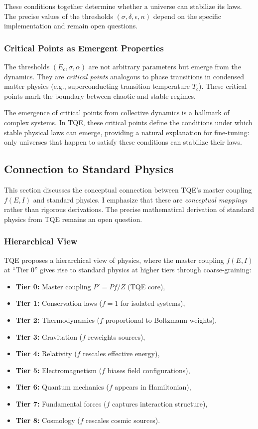 \documentclass[12pt,a4paper]{article}
\theoremstyle{definition}
\theoremstyle{remark}
\begin{document}
These conditions together determine whether a universe can stabilize its laws. The precise values of the thresholds $(\sigma, \delta, \epsilon, n)$ depend on the specific implementation and remain open questions.

\subsubsection{Critical Points as Emergent Properties}

The thresholds $(E_c, \sigma, \alpha)$ are not arbitrary parameters but emerge from the dynamics. They are \emph{critical points} analogous to phase transitions in condensed matter physics (e.g., superconducting transition temperature $T_c$). These critical points mark the boundary between chaotic and stable regimes.

The emergence of critical points from collective dynamics is a hallmark of complex systems. In TQE, these critical points define the conditions under which stable physical laws can emerge, providing a natural explanation for fine-tuning: only universes that happen to satisfy these conditions can stabilize their laws.

\subsection{Connection to Standard Physics}

This section discusses the conceptual connection between TQE's master coupling $f(E,I)$ and standard physics. I emphasize that these are \emph{conceptual mappings} rather than rigorous derivations. The precise mathematical derivation of standard physics from TQE remains an open question.

\subsubsection{Hierarchical View}

TQE proposes a hierarchical view of physics, where the master coupling $f(E,I)$ at ``Tier 0'' gives rise to standard physics at higher tiers through coarse-graining:

\begin{itemize}
\item \textbf{Tier 0:} Master coupling $P' = P f / Z$ (TQE core),
\item \textbf{Tier 1:} Conservation laws ($f = 1$ for isolated systems),
\item \textbf{Tier 2:} Thermodynamics ($f$ proportional to Boltzmann weights),
\item \textbf{Tier 3:} Gravitation ($f$ reweights sources),
\item \textbf{Tier 4:} Relativity ($f$ rescales effective energy),
\item \textbf{Tier 5:} Electromagnetism ($f$ biases field configurations),
\item \textbf{Tier 6:} Quantum mechanics ($f$ appears in Hamiltonian),
\item \textbf{Tier 7:} Fundamental forces ($f$ captures interaction structure),
\item \textbf{Tier 8:} Cosmology ($f$ rescales cosmic sources).
\end{itemize}
\end{document}
